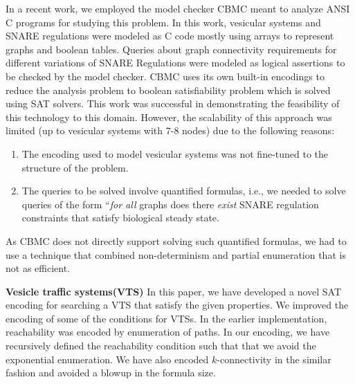 In a recent work, we employed the model checker CBMC \cite{CKY03, ckl2004} meant to analyze ANSI C programs for studying this problem.  In this work, vesicular systems and SNARE regulations were modeled as C code mostly using arrays to represent graphs and boolean tables.  Queries about graph connectivity requirements for different variations of SNARE Regulations were modeled as logical assertions to be checked by the model checker.  CBMC uses its own built-in encodings to reduce the analysis problem to boolean satisfiability problem which is solved using SAT solvers.  This work was successful in demonstrating the feasibility of this technology to this domain.  However, the scalability of this approach was limited (up to vesicular systems with 7-8 nodes) due to the following reasons: 
\begin{enumerate}
\item The encoding used to model vesicular systems was not fine-tuned to the structure of the problem.
\item The queries to be solved involve quantified formulas, i.e., we needed to solve queries of the form ``\emph{for all} graphs does  there \emph{exist} SNARE regulation constraints that satisfy biological steady state.
\end{enumerate}
As CBMC does not directly support solving such quantified formulas, we had to use a technique that combined non-determinism and partial enumeration that is not as efficient.\newline











%
\textbf{Vesicle traffic systems(VTS)} In this paper, we have developed a novel SAT encoding for
searching a VTS that satisfy the given properties.
%
We improved the encoding of some of the conditions for VTSs.
%
In the earlier implementation, reachability was encoded by
enumeration of paths.
%
In our encoding, we have recursively defined the reachability condition
such that that we avoid the exponential enumeration.
%
We have also encoded $k$-connectivity in the similar fashion and
avoided a blowup in the formula size.
%

